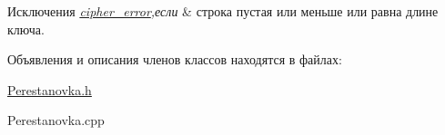 \begin{DoxyExceptions}{Исключения}
{\em \hyperlink{classcipher__error}{cipher\+\_\+error},если} & строка пустая или меньше или равна длине ключа. \\
\hline
\end{DoxyExceptions}


Объявления и описания членов классов находятся в файлах\+:\begin{DoxyCompactItemize}
\item 
\hyperlink{Perestanovka_8h}{Perestanovka.\+h}\item 
Perestanovka.\+cpp\end{DoxyCompactItemize}
